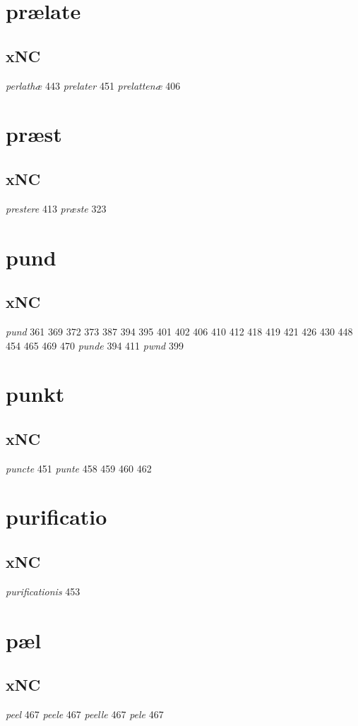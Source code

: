 \documentclass[a4paper,twocolumn]{article}
\begin{document}
\section{prælate}
\label{sec:orgda8a90e}
\subsection{xNC}
\label{sec:org62b4910}
\emph{perlathæ} 443 \emph{prelater} 451 \emph{prelattenæ} 406 
\section{præst}
\label{sec:org3eeadab}
\subsection{xNC}
\label{sec:orgcc6992b}
\emph{prestere} 413 \emph{præste} 323 
\section{pund}
\label{sec:orgd60c8d8}
\subsection{xNC}
\label{sec:orgb2cb25b}
\emph{pund} 361 369 372 373 387 394 395 401 402 406 410 412 418 419 421 426 430 448 454 465 469 470 \emph{punde} 394 411 \emph{pwnd} 399 
\section{punkt}
\label{sec:org4569893}
\subsection{xNC}
\label{sec:org7d6b4c5}
\emph{puncte} 451 \emph{punte} 458 459 460 462 
\section{purificatio}
\label{sec:org7745d7d}
\subsection{xNC}
\label{sec:org0ff0dc0}
\emph{purificationis} 453 
\section{pæl}
\label{sec:org5b0acec}
\subsection{xNC}
\label{sec:org697f37a}
\emph{peel} 467 \emph{peele} 467 \emph{peelle} 467 \emph{pele} 467 
\end{document}
